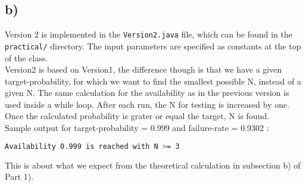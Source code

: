 \documentclass{article}
\begin{document}
    \subsection*{b)}
    
      Version 2 is implemented in the \texttt{Version2.java} file, which can be found in the \texttt{practical/} directory. The input parameters are specified as constants at the top of the class.\\
      Version2 is based on Version1, the difference though is that we have a given target-probability, for which we want to find the smallest possible N, instead of a given N. The same calculation for the availability as in the previous version is used inside a while loop. After each run, the N for testing is increased by one. Once the calculated probability is grater or equal the target, N is found.\\
      \newline
      Sample output for target-probability = 0.999 and failure-rate = 0.9302 :
      \begin{lstlisting}[language=sh]
        Availability 0.999 is reached with N >= 3
      \end{lstlisting}
      This is about what we expect from the theoretical calculation in subsection b) of Part 1).
  
\end{document}
